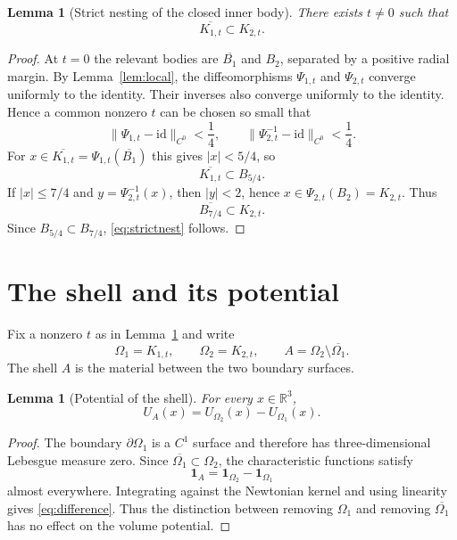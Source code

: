 \documentclass[11pt]{article}
\newtheorem{lemma}[theorem]{Lemma}
\theoremstyle{definition}
\theoremstyle{remark}
\newcommand{\R}{\mathbb{R}}
\newcommand{\Om}{\Omega}
\newcommand{\1}{\mathbf{1}}
\begin{document}
\begin{lemma}[Strict nesting of the closed inner body]\label{lem:nesting}
There exists $t\ne0$ such that
\begin{equation}\label{eq:strictnest}
 \overline{K_{1,t}}\subset K_{2,t}.
\end{equation}
\end{lemma}

\begin{proof}
At $t=0$ the relevant bodies are $\overline{B_1}$ and $B_2$, separated by a positive radial margin. By Lemma~\ref{lem:local}, the diffeomorphisms $\Psi_{1,t}$ and $\Psi_{2,t}$ converge uniformly to the identity. Their inverses also converge uniformly to the identity. Hence a common nonzero $t$ can be chosen so small that
\[
 \|\Psi_{1,t}-\mathrm{id}\|_{C^0}<\frac14,
 \qquad
 \|\Psi_{2,t}^{-1}-\mathrm{id}\|_{C^0}<\frac14.
\]
For $x\in\overline{K_{1,t}}=\Psi_{1,t}(\overline{B_1})$ this gives $|x|<5/4$, so
\[
 \overline{K_{1,t}}\subset B_{5/4}.
\]
If $|x|\le7/4$ and $y=\Psi_{2,t}^{-1}(x)$, then $|y|<2$, hence $x\in\Psi_{2,t}(B_2)=K_{2,t}$. Thus
\[
 \overline{B_{7/4}}\subset K_{2,t}.
\]
Since $B_{5/4}\subset B_{7/4}$, \eqref{eq:strictnest} follows.
\end{proof}

\section{The shell and its potential}

Fix a nonzero $t$ as in Lemma~\ref{lem:nesting} and write
\[
 \Om_1=K_{1,t},\qquad
 \Om_2=K_{2,t},\qquad
 A=\Om_2\setminus\overline{\Om_1}.
\]
The shell $A$ is the material between the two boundary surfaces.

\begin{lemma}[Potential of the shell]\label{lem:difference}
For every $x\in\R^3$,
\begin{equation}\label{eq:difference}
 U_A(x)=U_{\Om_2}(x)-U_{\Om_1}(x).
\end{equation}
\end{lemma}

\begin{proof}
The boundary $\partial\Om_1$ is a $C^1$ surface and therefore has three-dimensional Lebesgue measure zero. Since $\overline{\Om_1}\subset\Om_2$, the characteristic functions satisfy
\[
 \1_A=\1_{\Om_2}-\1_{\Om_1}
\]
almost everywhere. Integrating against the Newtonian kernel and using linearity gives \eqref{eq:difference}. Thus the distinction between removing $\Om_1$ and removing $\overline{\Om_1}$ has no effect on the volume potential.
\end{proof}
\end{document}
